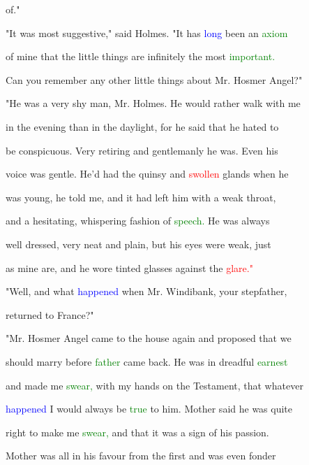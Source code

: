  of."



 "It was most suggestive," said Holmes. "It has \textcolor{blue}{long} been an \textcolor{green}{axiom}

 of mine that the little things are infinitely the most \textcolor{green}{important.}

 Can you remember any other little things about Mr. Hosmer \textcolor{BurntOrange}{Angel?"}



 "He was a very shy man, Mr. Holmes. He would rather walk with me

 in the evening than in the daylight, for he said that he hated to

 be conspicuous. Very retiring and gentlemanly he was. Even his

 voice was gentle. He'd had the quinsy and \textcolor{red}{swollen} glands when he

 was \textcolor{BurntOrange}{young,} he told me, and it had left him with a weak throat,

 and a hesitating, whispering fashion of \textcolor{green}{speech.} He was always

 well dressed, very neat and plain, but his eyes were weak, just

 as mine are, and he wore tinted glasses against the \textcolor{red}{glare."}



 "Well, and what \textcolor{blue}{happened} when Mr. Windibank, your stepfather,

 returned to France?"



 "Mr. Hosmer \textcolor{BurntOrange}{Angel} came to the house again and proposed that we

 should \textcolor{BurntOrange}{marry} before \textcolor{green}{father} came back. He was in \textcolor{BurntOrange}{dreadful} \textcolor{green}{earnest}

 and made me \textcolor{green}{swear,} with my hands on the \textcolor{BurntOrange}{Testament,} that whatever

 \textcolor{blue}{happened} I would always be \textcolor{green}{true} to him. \textcolor{BurntOrange}{Mother} said he was quite

 right to make me \textcolor{green}{swear,} and that it was a sign of his \textcolor{BurntOrange}{passion.}

 \textcolor{BurntOrange}{Mother} was all in his favour from the first and was even fonder

